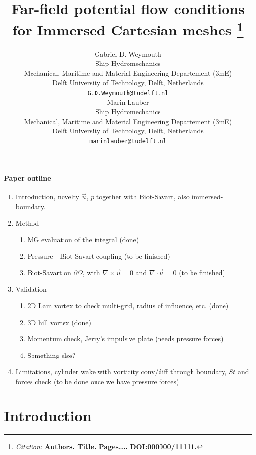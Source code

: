 \documentclass{article}
\title{Far-field potential flow conditions for Immersed Cartesian meshes
\thanks{\textit{\underline{Citation}}: 
\textbf{Authors. Title. Pages.... DOI:000000/11111.}} 
}
\author{
    Gabriel D. Weymouth\\
    Ship Hydromechanics\\
    Mechanical, Maritime and Material Engineering Departement (3mE) \\
    Delft University of Technology, Delft, Netherlands \\
    \texttt{G.D.Weymouth@tudelft.nl} \\
    \AND
    Marin Lauber\\
    Ship Hydromechanics\\
    Mechanical, Maritime and Material Engineering Departement (3mE) \\
    Delft University of Technology, Delft, Netherlands \\
    \texttt{marinlauber@tudelft.nl} \\
}
\begin{document}
\maketitle


\begin{abstract}
\lipsum[1]
\end{abstract}



\paragraph{Paper outline}
\begin{enumerate}
    \item Introduction, novelty $\vec u$, $p$ together with Biot-Savart, also immersed-boundary.
    \item Method
    \begin{enumerate}
        \item MG evaluation of the integral (done)
        \item Pressure - Biot-Savart coupling (to be finished)
        \item Biot-Savart on $\partial\Omega$, with $\nabla\times\vec u=0$ and $\nabla\cdot\vec u = 0$ (to be finished)
    \end{enumerate}
    \item Validation
    \begin{enumerate}
        \item 2D Lam vortex to check multi-grid, radius of influence, etc. (done)
        \item 3D hill vortex (done)
        \item Momentum check, Jerry's impulsive plate (needs pressure forces)
        \item Something else?
    \end{enumerate}
    \item Limitations, cylinder wake with vorticity conv/diff through boundary, $St$ and forces check (to be done once we have pressure forces)
\end{enumerate}

\section{Introduction}
\end{document}
